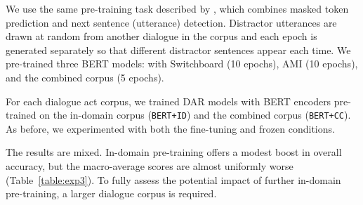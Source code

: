 \documentclass[11pt,a4paper]{article}
\begin{document}
We use the same pre-training task described by \citet{devlinBERTPretrainingDeep2018}, which combines masked token prediction and next sentence (utterance) detection. 
Distractor utterances are drawn at random from another dialogue in the corpus
and each epoch is generated separately so that different distractor sentences appear each time.
We pre-trained three BERT models: with Switchboard (10 epochs), AMI (10 epochs), and the combined corpus (5 epochs).

For each dialogue act corpus, we trained DAR models with BERT encoders pre-trained on the in-domain corpus (\texttt{BERT+ID}) and the combined corpus (\texttt{BERT+CC}).
As before, we experimented with both the fine-tuning and frozen conditions.

The results are mixed.
In-domain pre-training offers a modest boost in overall accuracy,
but the macro-average scores are almost uniformly worse (Table~\ref{table:exp3}).
To fully assess the potential impact of further in-domain pre-training, a larger dialogue corpus is required.
\end{document}
